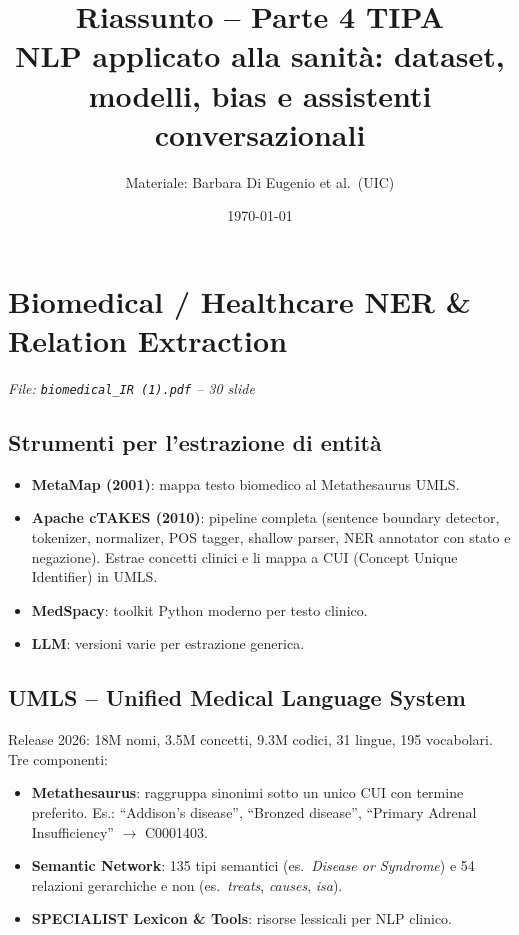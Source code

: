 \documentclass[a4paper,12pt]{article}
\title{\textbf{Riassunto -- Parte 4 TIPA}\\
\large NLP applicato alla sanit\`a: dataset, modelli, bias e assistenti conversazionali}
\author{Materiale: Barbara Di Eugenio et al.\ (UIC)}
\date{\today}
\begin{document}
\maketitle
\tableofcontents
\newpage

\section{Biomedical / Healthcare NER \& Relation Extraction}
\textit{File: \texttt{biomedical\_IR (1).pdf} -- 30 slide}

\subsection{Strumenti per l'estrazione di entit\`a}
\begin{itemize}
    \item \textbf{MetaMap (2001)}: mappa testo biomedico al Metathesaurus UMLS.
    \item \textbf{Apache cTAKES (2010)}: pipeline completa (sentence boundary detector, tokenizer, normalizer, POS tagger, shallow parser, NER annotator con stato e negazione). Estrae concetti clinici e li mappa a CUI (Concept Unique Identifier) in UMLS.
    \item \textbf{MedSpacy}: toolkit Python moderno per testo clinico.
    \item \textbf{LLM}: versioni varie per estrazione generica.
\end{itemize}

\subsection{UMLS -- Unified Medical Language System}
Release 2026: 18M nomi, 3.5M concetti, 9.3M codici, 31 lingue, 195 vocabolari. Tre componenti:
\begin{itemize}
    \item \textbf{Metathesaurus}: raggruppa sinonimi sotto un unico CUI con termine preferito. Es.: ``Addison's disease'', ``Bronzed disease'', ``Primary Adrenal Insufficiency'' $\to$ C0001403.
    \item \textbf{Semantic Network}: 135 tipi semantici (es.\ \textit{Disease or Syndrome}) e 54 relazioni gerarchiche e non (es.\ \textit{treats}, \textit{causes}, \textit{isa}).
    \item \textbf{SPECIALIST Lexicon \& Tools}: risorse lessicali per NLP clinico.
\end{itemize}
\end{document}
